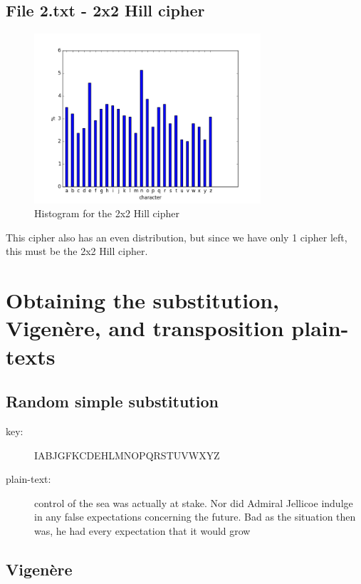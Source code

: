 \documentclass[a4paper]{article}
\begin{document}
    \subsection{File 2.txt - 2x2 Hill cipher}

        \begin{figure}[h]
            \centering
            \includegraphics[width=0.75\textwidth]{histogram_2.png}
            \caption{Histogram for the 2x2 Hill cipher}
        \end{figure}

        This cipher also has an even distribution, but since we have only 1 cipher left, this must be
        the 2x2 Hill cipher.

\section{Obtaining the substitution, Vigenère, and transposition plain-texts}

    \subsection{Random simple substitution}
        
        \begin{description}
            \item[key:] IABJGFKCDEHLMNOPQRSTUVWXYZ
            \item[plain-text:] control of the sea was actually at stake. Nor did Admiral Jellicoe
            indulge in any false expectations concerning the future. Bad as the situation 
            then was, he had every expectation that it would grow
        \end{description}

    \subsection{Vigenère}
\end{document}
